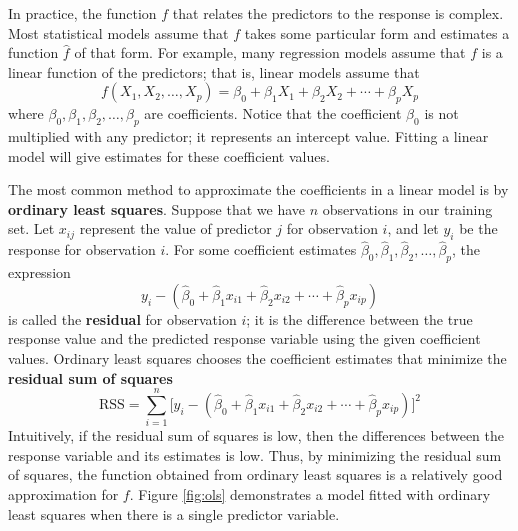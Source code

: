 \documentclass{article}
\begin{document}
In practice, the function $f$ that relates the predictors to the response is complex. Most statistical models assume that $f$ takes some particular form and estimates a function $\hat{f}$ of that form. For example, many regression models assume that $f$ is a linear function of the predictors; that is, linear models assume that
\begin{equation}\label{eqn:linear-model}
	f(X_1, X_2, \dotsc, X_p) = \beta_0 + \beta_1 X_1 + \beta_2 X_2 + \cdots + \beta_p X_p
\end{equation}
where $\beta_0, \beta_1, \beta_2, \dotsc, \beta_p$ are coefficients. Notice that the coefficient $\beta_0$ is not multiplied with any predictor; it represents an intercept value. Fitting a linear model will give estimates for these coefficient values.

The most common method to approximate the coefficients in a linear model is by \textbf{ordinary least squares}. Suppose that we have $n$ observations in our training set. Let $x_{ij}$ represent the value of predictor $j$ for observation $i$, and let $y_i$ be the response for observation $i$. For some coefficient estimates $\hat{\beta}_0, \hat{\beta}_1, \hat{\beta}_2, \dotsc, \hat{\beta}_p$, the expression
\begin{equation}
	y_i - (\hat{\beta}_0 + \hat{\beta}_1 x_{i1} + \hat{\beta}_2 x_{i2} + \cdots + \hat{\beta}_p x_{ip})
\end{equation}
is called the \textbf{residual} for observation $i$; it is the difference between the true response value and the predicted response variable using the given coefficient values. Ordinary least squares chooses the coefficient estimates that minimize the \textbf{residual sum of squares}
\begin{equation}\label{eqn:RSS}
	\text{RSS} = \sum\limits_{i = 1}^n \Big[y_i - (\hat{\beta}_0 + \hat{\beta}_1 x_{i1} + \hat{\beta}_2 x_{i2} + \cdots + \hat{\beta}_p x_{ip})\Big]^2
\end{equation}
Intuitively, if the residual sum of squares is low, then the differences between the response variable and its estimates is low. Thus, by minimizing the residual sum of squares, the function obtained from ordinary least squares is a relatively good approximation for $f$. Figure \ref{fig:ols} demonstrates a model fitted with ordinary least squares when there is a single predictor variable.
\end{document}
